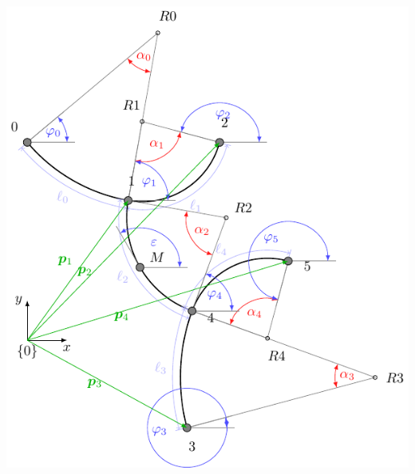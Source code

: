 \documentclass[10pt,a4paper]{article}
\begin{document}
	\includegraphics[scale=1]{pics/general_model/model_plain.pdf}
\end{document}
